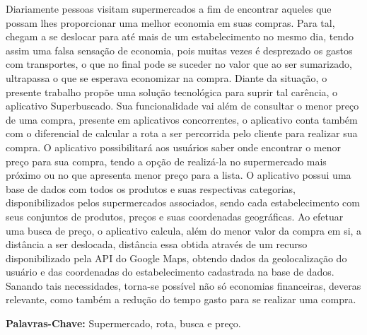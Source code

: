 \setlength{\absparsep}{18pt} %

\begin{resumo}
\vspace{1cm}
Diariamente pessoas visitam supermercados a fim de encontrar aqueles que possam lhes proporcionar uma melhor economia em suas compras. Para tal, chegam a se deslocar para até mais de um estabelecimento no mesmo dia, tendo assim uma falsa sensação de economia, pois muitas vezes é desprezado os gastos com transportes, o que no final pode se suceder no valor que ao ser sumarizado, ultrapassa o que se esperava economizar na compra. Diante da situação, o presente trabalho propõe uma solução tecnológica para suprir tal carência, o aplicativo Superbuscado. Sua funcionalidade vai além de consultar o menor preço de uma compra, presente em aplicativos concorrentes, o aplicativo conta também com o diferencial de calcular a rota a ser percorrida pelo cliente para realizar sua compra.
O aplicativo possibilitará aos usuários saber onde encontrar o menor preço para sua compra, tendo a opção de realizá-la no supermercado mais próximo ou no que apresenta menor preço para a lista.
O aplicativo possui uma base de dados com todos os produtos e suas respectivas categorias, disponibilizados pelos supermercados associados, sendo cada estabelecimento com seus conjuntos de produtos, preços e suas coordenadas geográficas. Ao efetuar uma busca de preço, o aplicativo calcula, além do menor valor da compra em si, a distância a ser deslocada, distância essa obtida através de um recurso disponibilizado pela API do Google Maps, obtendo dados da geolocalização do usuário e das coordenadas do estabelecimento cadastrada na base de dados.
Sanando tais necessidades, torna-se possível não só economias financeiras, deveras relevante, como também a redução do tempo gasto para se realizar uma compra.

\textbf{Palavras-Chave:} Supermercado, rota, busca e preço.
\end{resumo}


